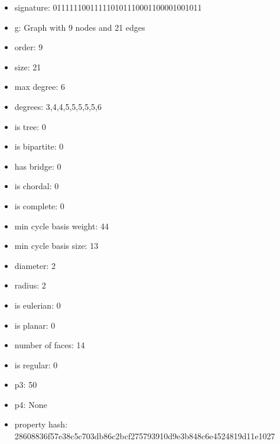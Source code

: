 \newpage
\begin{figure}
\end{figure}
\begin{itemize}
\item signature: 011111100111110101110001100001001011
\item g: Graph with 9 nodes and 21 edges
\item order: 9
\item size: 21
\item max degree: 6
\item degrees: 3,4,4,5,5,5,5,5,6
\item is tree: 0
\item is bipartite: 0
\item has bridge: 0
\item is chordal: 0
\item is complete: 0
\item min cycle basis weight: 44
\item min cycle basis size: 13
\item diameter: 2
\item radius: 2
\item is eulerian: 0
\item is planar: 0
\item number of faces: 14
\item is regular: 0
\item p3: 50
\item p4: None
\item property hash: 28608836f57e38c5c703db86c2bcf275793910d9e3b848c6e4524819d11e1027
\end{itemize}
